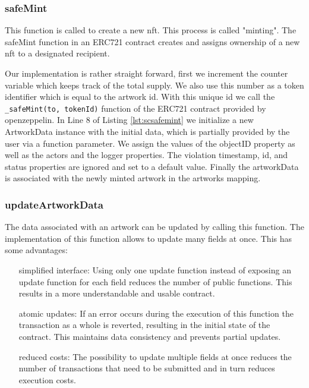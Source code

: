 \subsubsection{safeMint}
This function is called to create a new \gls{nft}. This process is called "minting". The safeMint function in an ERC721 contract creates and assigns ownership of a new \gls{nft} to a designated recipient. 



Our implementation is rather straight forward, first we increment the counter variable which keeps track of the total supply. We also use this number as a token identifier which is equal to the artwork id. With this unique id we call the \texttt{\_safeMint(to, tokenId)} function of the ERC721 contract provided by openzeppelin. In Line 8 of Listing \ref{lst:scsafemint} we initialize a new ArtworkData instance with the initial data, which is partially provided by the user via a function parameter. We assign the values of the objectID property as well as the actors and the logger properties. The violation timestamp, id, and status properties are ignored and set to a default value. Finally the artworkData is associated with the newly minted artwork in the artworks mapping.

\subsubsection{updateArtworkData}
The data associated with an artwork can be updated by calling this function. The implementation of this function allows to update many fields at once. This has some advantages:

\begin{itemize}[align=left, font=\itshape]
    \item[simplified interface:] Using only one update function instead of exposing an update function for each field reduces the number of public functions. This results in a more understandable and usable contract.
    \item[atomic updates:] If an error occurs during the execution of this function the transaction as a whole is reverted, resulting in the initial state of the contract. This maintains data consistency and prevents partial updates.
    \item[reduced costs:] The possibility to update multiple fields at once reduces the number of transactions that need to be submitted and in turn reduces execution costs.
\end{itemize}


